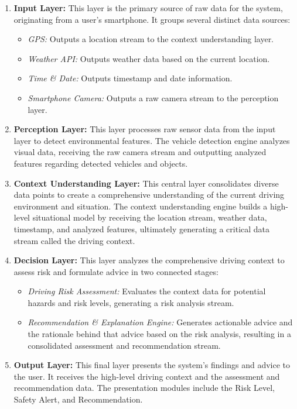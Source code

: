 \begin{enumerate}
    \item \textbf{Input Layer:} This layer is the primary source of raw data for the system, originating from a user's smartphone. It groups several distinct data sources:
    \begin{itemize}
        \item \textit{GPS:} Outputs a location stream to the context understanding layer.
        \item \textit{Weather API:} Outputs weather data based on the current location.
        \item \textit{Time \& Date:} Outputs timestamp and date information.
        \item \textit{Smartphone Camera:} Outputs a raw camera stream to the perception layer.
    \end{itemize}
    \item \textbf{Perception Layer:} This layer processes raw sensor data from the input layer to detect environmental features. The vehicle detection engine analyzes visual data, receiving the raw camera stream and outputting analyzed features regarding detected vehicles and objects.
    \item \textbf{Context Understanding Layer:} This central layer consolidates diverse data points to create a comprehensive understanding of the current driving environment and situation. The context understanding engine builds a high-level situational model by receiving the location stream, weather data, timestamp, and analyzed features, ultimately generating a critical data stream called the driving context.
    \item \textbf{Decision Layer:} This layer analyzes the comprehensive driving context to assess risk and formulate advice in two connected stages:
    \begin{itemize}
        \item \textit{Driving Risk Assessment:} Evaluates the context data for potential hazards and risk levels, generating a risk analysis stream.
        \item \textit{Recommendation \& Explanation Engine:} Generates actionable advice and the rationale behind that advice based on the risk analysis, resulting in a consolidated assessment and recommendation stream.
    \end{itemize}
    \item \textbf{Output Layer:} This final layer presents the system’s findings and advice to the user. It receives the high-level driving context and the assessment and recommendation data. The presentation modules include the Risk Level, Safety Alert, and Recommendation.
\end{enumerate}


